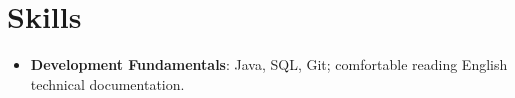 \section{Skills}
\begin{itemize}[leftmargin=0.15in,label={}]
  \item \small{\textbf{Development Fundamentals}: Java, SQL, Git; comfortable reading English technical documentation.}
\end{itemize}
